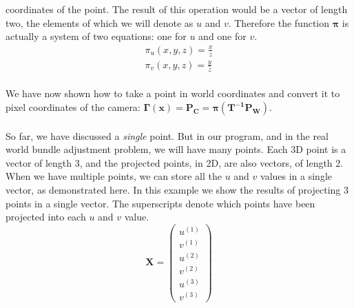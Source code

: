 \documentclass{article}
\begin{document}
coordinates of the point. The result of this operation would be a
vector of length two, the elements of which we will denote as $u$ and
$v$.  Therefore the function $\boldsymbol{\pi}$ is actually a system
of two equations: one for $u$ and one for $v$.
\begin{align}
  \label{eq:proj-3d-to-2d}
    \pi_u(x,y,z) = \frac{x}{z} \\ \nonumber
    \pi_v(x,y,z) = \frac{y}{z}
\end{align}
\\
We have now shown how to take a point in world coordinates and convert
it to pixel coordinates of the camera: $ \mathbf{\Gamma}(\mathbf{x}) =
\mathbf{P_{C}} = \boldsymbol{\pi}(\mathbf{T^{-1}}\mathbf{P_{W}})$.
\\
\\
So far, we have discussed a \emph{single} point.  But in our program,
and in the real world bundle adjustment problem, we will have many
points.  Each 3D point is a vector of length 3, and the projected
points, in 2D, are also vectors, of length 2.  When we have multiple
points, we can store all the $u$ and $v$ values in a single vector, as
demonstrated here.  In this example we show the results of projecting
3 points in a single vector.  The superscripts denote which points
have been projected into each $u$ and $v$ value.
\begin{equation}
  \label{eq:single-vec}
  \mathbf{X} = \left(
  \begin{array}{c}
    u^{(1)} \\
    v^{(1)} \\
    u^{(2)} \\
    v^{(2)} \\
    u^{(3)} \\
    v^{(3)}
  \end{array}
  \right)
\end{equation}
\end{document}
